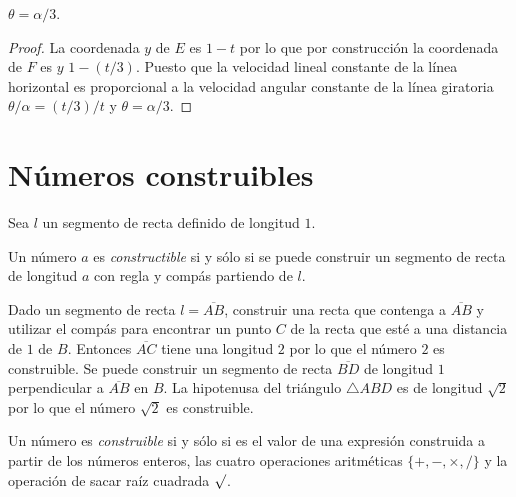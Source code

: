 \begin{theorem}
$\theta = \alpha/3$.
\end{theorem}
\begin{proof}
La coordenada $y$ de $E$ es $1-t$ por lo que por construcción la coordenada de $F$ es $y$ $1-(t/3)$. Puesto que la velocidad lineal constante de la línea horizontal es proporcional a la velocidad angular constante de la línea giratoria $\theta/\alpha = (t/3)/t$ y $\theta = \alpha/3$.
\end{proof}


\section{Números construibles}\label{s.trisect-constructible}

Sea $l$ un segmento de recta definido de longitud $1$.
\begin{definition}
Un número $a$ es \emph{constructible} si y sólo si se puede construir un segmento de recta de longitud $a$ con regla y compás partiendo de $l$.
\end{definition}

Dado un segmento de recta $l=\overline{AB}$, construir una recta que contenga a $\overline{AB}$ y utilizar el compás para encontrar un punto $C$ de la recta que esté a una distancia de $1$ de $B$. Entonces $\overline{AC}$ tiene una longitud $2$ por lo que el número $2$ es construible. Se puede construir un segmento de recta $\overline{BD}$ de longitud $1$ perpendicular a $\overline{AB}$ en $B$. La hipotenusa del triángulo $\triangle ABD$ es de longitud $\sqrt{2}$ por lo que el número $\sqrt{2}$ es construible.

\begin{theorem}\label{thm.trisect-constructible}
Un número es \emph{construible} si y sólo si es el valor de una expresión construida a partir de los números enteros, las cuatro operaciones aritméticas $\{+,-,\times,/\}$ y la operación de sacar raíz cuadrada $\surd$.
\end{theorem}

